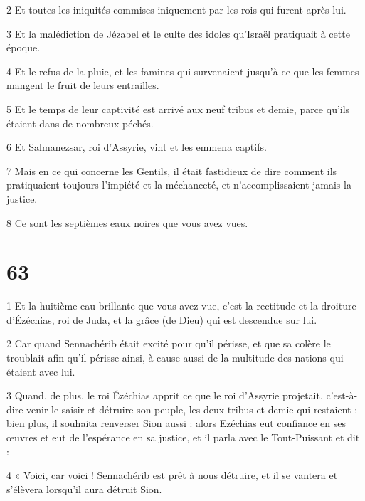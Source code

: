 \par 2 Et toutes les iniquités commises iniquement par les rois qui furent après lui.

\par 3 Et la malédiction de Jézabel et le culte des idoles qu'Israël pratiquait à cette époque.

\par 4 Et le refus de la pluie, et les famines qui survenaient jusqu'à ce que les femmes mangent le fruit de leurs entrailles.

\par 5 Et le temps de leur captivité est arrivé aux neuf tribus et demie, parce qu'ils étaient dans de nombreux péchés.

\par 6 Et Salmanezsar, roi d'Assyrie, vint et les emmena captifs.

\par 7 Mais en ce qui concerne les Gentils, il était fastidieux de dire comment ils pratiquaient toujours l'impiété et la méchanceté, et n'accomplissaient jamais la justice.

\par 8 Ce sont les septièmes eaux noires que vous avez vues.

\chapter{63}

\par 1 Et la huitième eau brillante que vous avez vue, c'est la rectitude et la droiture d'Ézéchias, roi de Juda, et la grâce (de Dieu) qui est descendue sur lui.

\par 2 Car quand Sennachérib était excité pour qu'il périsse, et que sa colère le troublait afin qu'il périsse ainsi, à cause aussi de la multitude des nations qui étaient avec lui.

\par 3 Quand, de plus, le roi Ézéchias apprit ce que le roi d'Assyrie projetait, c'est-à-dire venir le saisir et détruire son peuple, les deux tribus et demie qui restaient : bien plus, il souhaita renverser Sion aussi : alors Ezéchias eut confiance en ses œuvres et eut de l'espérance en sa justice, et il parla avec le Tout-Puissant et dit :

\par 4 « Voici, car voici ! Sennachérib est prêt à nous détruire, et il se vantera et s’élèvera lorsqu’il aura détruit Sion.

